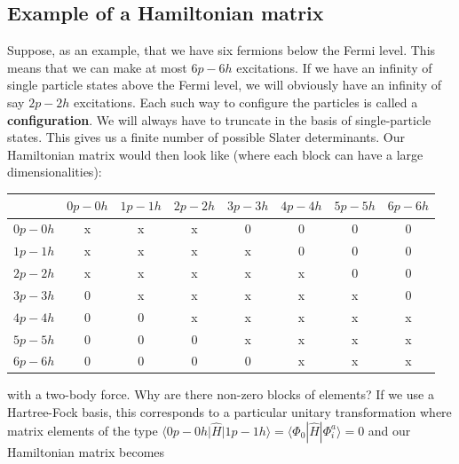 \subsection{Example of a Hamiltonian matrix}

Suppose, as an example, that we have six fermions below the Fermi level.
This means that we can make at most $6p-6h$ excitations. If we have an infinity of single particle states above the Fermi level, we will obviously have an infinity of say $2p-2h$ excitations. Each such way to configure the particles is called a \textbf{configuration}. We will always have to truncate in the basis of single-particle states.
This gives us a finite number of possible Slater determinants. Our Hamiltonian matrix would then look like (where each block can have a large dimensionalities):

\begin{table}
\begin{center}
\begin{tabular}{cccccccc}
\hline
\multicolumn{1}{c}{  } & \multicolumn{1}{c}{ $0p-0h$ } & \multicolumn{1}{c}{ $1p-1h$ } & \multicolumn{1}{c}{ $2p-2h$ } & \multicolumn{1}{c}{ $3p-3h$ } & \multicolumn{1}{c}{ $4p-4h$ } & \multicolumn{1}{c}{ $5p-5h$ } & \multicolumn{1}{c}{ $6p-6h$ } \\
\hline
$0p-0h$ & x       & x       & x       & 0       & 0       & 0       & 0       \\
$1p-1h$ & x       & x       & x       & x       & 0       & 0       & 0       \\
$2p-2h$ & x       & x       & x       & x       & x       & 0       & 0       \\
$3p-3h$ & 0       & x       & x       & x       & x       & x       & 0       \\
$4p-4h$ & 0       & 0       & x       & x       & x       & x       & x       \\
$5p-5h$ & 0       & 0       & 0       & x       & x       & x       & x       \\
$6p-6h$ & 0       & 0       & 0       & 0       & x       & x       & x       \\
\hline
\end{tabular}
\end{center}
\end{table}
with a two-body force. Why are there non-zero blocks of elements? 
If we use a Hartree-Fock basis, this corresponds to a particular unitary transformation where matrix elements of the type $\langle 0p-0h \vert \hat{H} \vert 1p-1h\rangle =\langle \Phi_0 | \hat{H}|\Phi_{i}^{a}\rangle=0$ and our Hamiltonian matrix becomes 

